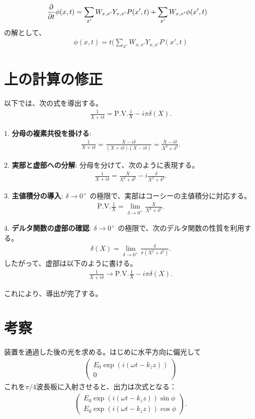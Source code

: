\documentclass[a4paper,11pt]{jsarticle}
\numberwithin{equation}{section}
\begin{document}
\begin{align}
  \pdv{t}\phi(x,t) &=\sum_{x'}W_{x,x'}Y_{x,x'}P(x',t) + \sum_{x'}W_{x,x'}\phi(x',t)
\end{align}
の解として、
\begin{align}
  \phi(x,t) = t(\sum_{x'}W_{x,x'}Y_{x,x'}P(x',t) 
\end{align}

\section{上の計算の修正}

以下では、次の式を導出する。
\begin{align}
    \frac{1}{X + i\delta} = \text{P.V.} \frac{1}{X} - i\pi\delta(X).
\end{align}

1. \textbf{分母の複素共役を掛ける}:
\begin{align}
    \frac{1}{X + i\delta} = \frac{X - i\delta}{(X + i\delta)(X - i\delta)} = \frac{X - i\delta}{X^2 + \delta^2}.
\end{align}

2. \textbf{実部と虚部への分解}:
分母を分けて、次のように表現する。
\begin{align}
    \frac{1}{X + i\delta} = \frac{X}{X^2 + \delta^2} - i\frac{\delta}{X^2 + \delta^2}.
\end{align}

3. \textbf{主値積分の導入}:
\(\delta \to 0^+\) の極限で、実部はコーシーの主値積分に対応する。
\begin{align}
    \text{P.V.} \frac{1}{X} = \lim_{\delta \to 0^+} \frac{X}{X^2 + \delta^2}.
\end{align}

4. \textbf{デルタ関数の虚部の確認}:
\(\delta \to 0^+\) の極限で、次のデルタ関数の性質を利用する。
\begin{align}
    \delta(X) = \lim_{\delta \to 0^+} \frac{\delta}{\pi(X^2 + \delta^2)}.
\end{align}
したがって、虚部は以下のように書ける。
\begin{align}
    \frac{1}{X + i\delta} \to \text{P.V.} \frac{1}{X} - i\pi\delta(X).
\end{align}

これにより、導出が完了する。
\section*{考察}
装置を通過した後の光を求める。はじめに水平方向に偏光して
\begin{align}
    \begin{pmatrix}
        E_0 \exp(i(\omega t - k_z z)) \\
        0
    \end{pmatrix}
\end{align}
これを\(\pi/4\)波長板に入射させると、出力は次式となる：
\begin{align}
    \begin{pmatrix}
        E_0 \exp(i(\omega t - k_z z)) \sin \phi \\
        E_0 \exp(i(\omega t - k_z z)) \cos \phi
    \end{pmatrix}.
\end{align}
\end{document}
